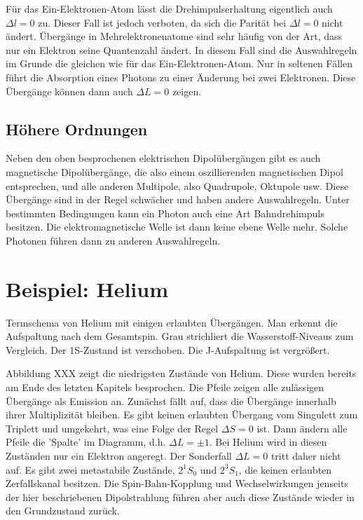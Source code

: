 Für das Ein-Elektronen-Atom lässt die Drehimpulserhaltung eigentlich auch $\Delta l = 0$ zu. Dieser Fall ist jedoch verboten, da sich die Parität bei $\Delta l = 0$ nicht ändert. Übergänge in Mehrelektronenatome sind sehr häufig von der Art, dass nur ein Elektron seine Quantenzahl ändert. In diesem Fall sind die Auswahlregeln im Grunde die gleichen wie für das Ein-Elektronen-Atom. Nur in seltenen Fällen führt die Absorption eines Photons zu einer Änderung bei zwei Elektronen. Diese Übergänge können dann auch $\Delta L = 0$ zeigen.



\subsection{Höhere Ordnungen}


Neben den oben besprochenen elektrischen Dipolübergängen gibt es auch magnetische Dipolübergänge, die also einem oszillierenden magnetischen Dipol entsprechen, und alle anderen Multipole, also Quadrupole, Oktupole usw. Diese Übergänge sind in der Regel schwächer und haben andere Auswahlregeln. Unter bestimmten Bedingungen kann ein Photon auch eine Art Bahndrehimpuls besitzen. Die elektromagnetische Welle ist dann keine ebene Welle mehr. Solche Photonen führen dann zu  anderen Auswahlregeln.



\section{Beispiel: Helium}
\begin{marginfigure}
    \caption{Termschema von Helium mit einigen erlaubten Übergängen. Man erkennt die Aufspaltung nach dem Gesamtspin. Grau strichliert die Wasserstoff-Niveaus zum Vergleich. Der 1S-Zustand ist verschoben. Die J-Aufspaltung ist vergrößert.}
\end{marginfigure}

Abbildung XXX zeigt die niedrigsten Zustände von Helium. Diese wurden bereits am Ende des letzten Kapitels besprochen. Die Pfeile zeigen alle zulässigen Übergänge als Emission an. Zunächst fällt auf, dass die Übergänge innerhalb ihrer Multiplizität bleiben. Es gibt keinen erlaubten Übergang vom Singulett zum Triplett und umgekehrt, was eine Folge der Regel $\Delta S = 0$ ist. Dann ändern alle Pfeile die 'Spalte' im Diagramm, d.h. $\Delta L = \pm 1$. Bei Helium wird in diesen Zuständen nur ein Elektron angeregt. Der Sonderfall $\Delta L = 0$ tritt daher nicht auf. Es gibt zwei metastabile Zustände, $2^1S_0$ und $2^3S_1$, die keinen erlaubten Zerfallskanal besitzen. Die Spin-Bahn-Kopplung und Wechselwirkungen jenseits der hier beschriebenen Dipolstrahlung führen aber auch diese Zustände wieder in den Grundzustand zurück.



